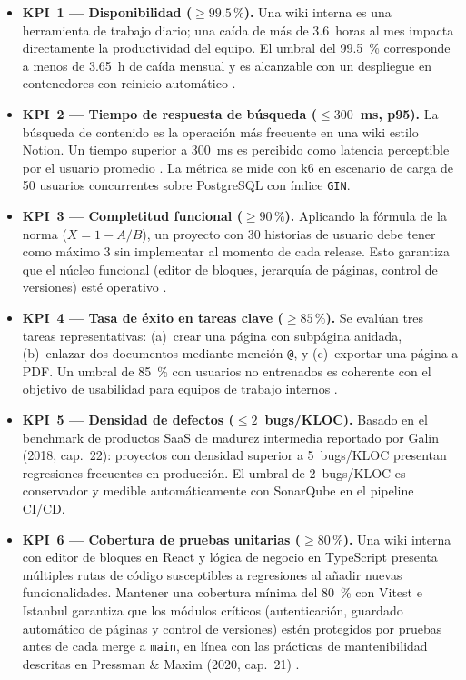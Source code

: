 \documentclass{report}
\begin{document}
\begin{itemize}

  \item \textbf{KPI~1 — Disponibilidad ($\geq 99.5\,\%$).}
  Una wiki interna es una herramienta de trabajo diario; una caída de más de
  3.6~horas al mes impacta directamente la productividad del equipo. El umbral
  del 99.5~\% corresponde a menos de 3.65~h de caída mensual y es alcanzable
  con un despliegue en contenedores con reinicio automático
  \citep{galin2018software}.

  \item \textbf{KPI~2 — Tiempo de respuesta de búsqueda ($\leq 300$~ms, p95).}
  La búsqueda de contenido es la operación más frecuente en una wiki estilo
  Notion. Un tiempo superior a 300~ms es percibido como latencia perceptible
  por el usuario promedio \citep{pressman2020software}. La métrica se mide con
  k6 en escenario de carga de 50 usuarios concurrentes sobre PostgreSQL con
  índice \texttt{GIN}.

  \item \textbf{KPI~3 — Completitud funcional ($\geq 90\,\%$).}
  Aplicando la fórmula de la norma ($X = 1 - A/B$), un proyecto con 30
  historias de usuario debe tener como máximo 3 sin implementar al momento de
  cada release. Esto garantiza que el núcleo funcional (editor de bloques,
  jerarquía de páginas, control de versiones) esté operativo
  \citep{isoiec25010}.

  \item \textbf{KPI~4 — Tasa de éxito en tareas clave ($\geq 85\,\%$).}
  Se evalúan tres tareas representativas: (a)~crear una página con subpágina
  anidada, (b)~enlazar dos documentos mediante mención \texttt{@}, y
  (c)~exportar una página a PDF. Un umbral de 85~\% con usuarios no entrenados
  es coherente con el objetivo de usabilidad para equipos de trabajo internos
  \citep{ieeestd730}.

  \item \textbf{KPI~5 — Densidad de defectos ($\leq 2$~bugs/KLOC).}
  Basado en el benchmark de productos SaaS de madurez intermedia reportado por
  Galin (2018, cap.~22): proyectos con densidad superior a 5~bugs/KLOC
  presentan regresiones frecuentes en producción. El umbral de 2~bugs/KLOC es
  conservador y medible automáticamente con SonarQube en el pipeline CI/CD.

  \item \textbf{KPI~6 — Cobertura de pruebas unitarias ($\geq 80\,\%$).}
  Una wiki interna con editor de bloques en React y lógica de negocio en
  TypeScript presenta múltiples rutas de código susceptibles a regresiones al
  añadir nuevas funcionalidades. Mantener una cobertura mínima del 80~\% con
  Vitest e Istanbul garantiza que los módulos críticos (autenticación, guardado
  automático de páginas y control de versiones) estén protegidos por pruebas
  antes de cada merge a \texttt{main}, en línea con las prácticas de
  mantenibilidad descritas en Pressman \& Maxim (2020, cap.~21)
  \citep{pressman2020software}.

\end{itemize}
\end{document}
